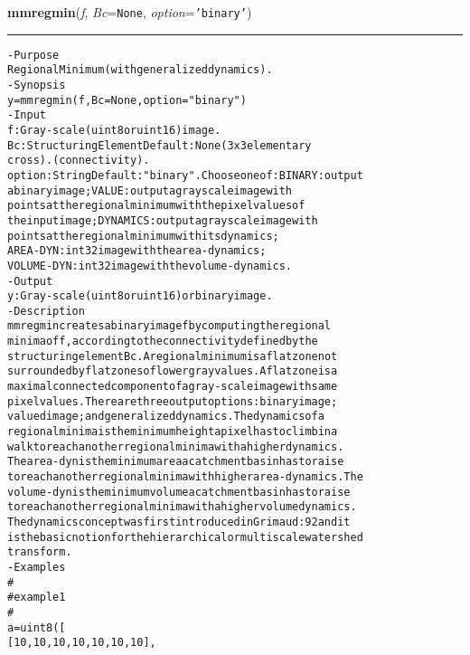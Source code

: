     \label{multireg:num_pymorph:mmregmin}
    \vspace{0.5ex}

    \begin{boxedminipage}{\textwidth}

    \raggedright \textbf{mmregmin}(\textit{f}, \textit{Bc}=\texttt{N\-o\-n\-e\-}, \textit{option}=\texttt{'\-b\-i\-n\-a\-r\-y\-'\-})

    \vspace{-1.5ex}

    \rule{\textwidth}{0.5\fboxrule}
\begin{alltt}
- Purpose
    Regional Minimum (with generalized dynamics).
- Synopsis
    y = mmregmin(f, Bc=None, option="binary")
- Input
    f:      Gray-scale (uint8 or uint16) image.
    Bc:     Structuring Element Default: None (3x3 elementary
            cross). (connectivity).
    option: String Default: "binary". Choose one of: BINARY: output
            a binary image; VALUE: output a grayscale image with
            points at the regional minimum with the pixel values of
            the input image; DYNAMICS: output a grayscale image with
            points at the regional minimum with its dynamics;
            AREA-DYN: int32 image with the area-dynamics;
            VOLUME-DYN: int32 image with the volume-dynamics.
- Output
    y: Gray-scale (uint8 or uint16) or binary image.
- Description
    mmregmin creates a binary image f by computing the regional
    minima of f , according to the connectivity defined by the
    structuring element Bc . A regional minimum is a flat zone not
    surrounded by flat zones of lower gray values. A flat zone is a
    maximal connected component of a gray-scale image with same
    pixel values. There are three output options: binary image;
    valued image; and generalized dynamics. The dynamics of a
    regional minima is the minimum height a pixel has to climb in a
    walk to reach another regional minima with a higher dynamics.
    The area-dyn is the minimum area a catchment basin has to raise
    to reach another regional minima with higher area-dynamics. The
    volume-dyn is the minimum volume a catchment basin has to raise
    to reach another regional minima with a higher volume dynamics.
    The dynamics concept was first introduced in Grimaud:92 and it
    is the basic notion for the hierarchical or multiscale watershed
    transform.
- Examples
    \#
    \#   example 1
    \#
    a = uint8([
        [10,  10,  10,  10,  10,  10,  10],

\end{alltt}
\end{boxedminipage}
